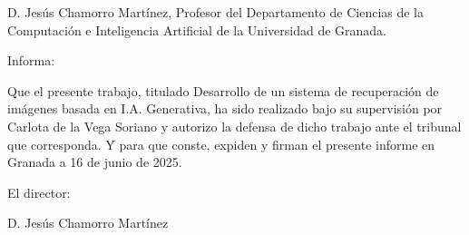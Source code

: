 D. Jesús Chamorro Martínez, Profesor del Departamento de Ciencias de la Computación e Inteligencia Artificial de la Universidad de Granada.

Informa:

Que el presente trabajo, titulado Desarrollo de un sistema de recuperación de imágenes basada en I.A. Generativa, ha sido realizado bajo su supervisión por Carlota de la Vega Soriano y autorizo la defensa de dicho trabajo ante el tribunal que corresponda.
Y para que conste, expiden y firman el presente informe en Granada a
16 de junio de 2025.

\vspace{5cm}

El director:

\vspace{3cm}

D. Jesús Chamorro Martínez